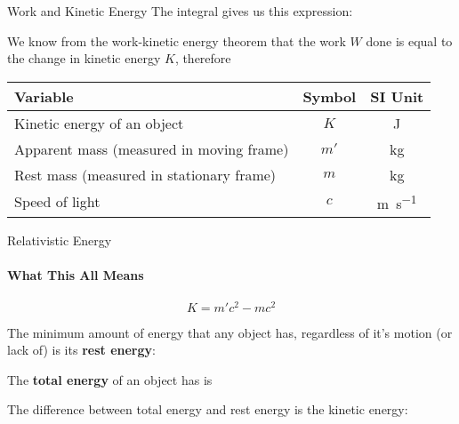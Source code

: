 \documentclass[12pt,compress,aspectratio=169]{beamer}
\newcommand{\eq}[2]{\vspace{#1}{\Large\begin{displaymath}#2\end{displaymath}}}
\begin{document}
\begin{frame}{Work and Kinetic Energy}
  The integral gives us this expression:
  
  \eq{-.25in}{
    W=\gamma mc^2-mc^2
  }

  \vspace{-.15in}We know from the work-kinetic energy theorem that the work $W$
  done is equal to the change in kinetic energy $K$, therefore
  
  \eq{-.2in}{ \boxed{K=m'c^2-mc^2} }

  \vspace{-.1in}
  \begin{center}
    \begin{tabular}{l|c|c}
      \rowcolor{pink}
      \textbf{Variable} & \textbf{Symbol} & \textbf{SI Unit}\\ \hline
      Kinetic energy of an object & $K$  & \si{\joule}\\
      Apparent mass (measured in moving frame) & $m'$ & \si{\kilo\gram}\\
      Rest mass (measured in stationary frame) & $m$  & \si{\kilo\gram}\\
      Speed of light              & $c$ & \si{\metre\per\second}
    \end{tabular}
  \end{center}
\end{frame}



\begin{frame}{Relativistic Energy}
  \framesubtitle{What This All Means}
  {\Large
    \begin{displaymath}
      \boxed{K=m'c^2-mc^2}
    \end{displaymath}
  }

  The minimum amount of energy that any object has, regardless of it's motion
  (or lack of) is its \textbf{rest energy}:
  
  \eq{-.4in}{ E_0=mc^2 }

  \vspace{-.2in}The \textbf{total energy} of an object has is
    
  \eq{-.3in}{
    E_T=m'c^2=\gamma mc^2
  }

  \vspace{-.2in}The difference between total energy and rest energy is the
  kinetic energy:

  \eq{-.3in}{
    K=E_T-E_0
  }
\end{frame}
\end{document}
